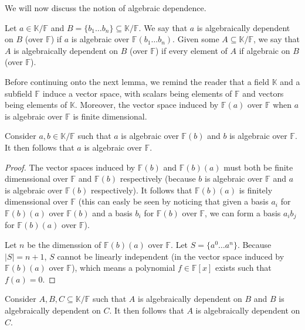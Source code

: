 We will now discuss the notion of algebraic dependence.

\begin{defn}
  Let $a \in \mathbb K / \mathbb F$ and $B = \{b _1 \ldots b _n \} \subseteq  \mathbb K / \mathbb F$. We say that $a$ is algebraically dependent on $B$ (over $ \mathbb{F} $) if $a$ is algebraic over $\mathbb F(b _1 \ldots b _n )$. Given some $A \subseteq  \mathbb K / \mathbb{F} $, we say that $A$ is algebraically dependent on $B$ (over $\mathbb{F} $) if every element of $A$ if algebraic on $B$ (over $\mathbb{F} $).
\end{defn}

Before continuing onto the next lemma, we remind the reader that a field $\mathbb K$ and a subfield $\mathbb{F}$ induce a vector space, with scalars being elements of $\mathbb{F} $ and vectors being elements of $\mathbb K$. Moreover, the vector space induced by $\mathbb{F} (a)$ over $\mathbb{F} $ when $a$ is algebraic over $\mathbb{F} $ is finite dimensional.

\begin{lemma}\label{lem:algebraic-transitivity}
  Consider $a, b \in \mathbb K / \mathbb{F} $ such that $a$ is algebraic over $\mathbb{F}(b) $ and $b$ is algebraic over $\mathbb{F}$. It then follows that $a$ is algebraic over $\mathbb{F}$.
\end{lemma}

\begin{proof}
  The vector spaces induced by $\mathbb{F} (b)$ and $\mathbb{F} (b)(a)$ must both be finite dimenssional over $\mathbb{F} $ and $\mathbb{F} (b)$ respectively (because $b$ is algebraic over $\mathbb{F} $ and $a$ is algebraic over $\mathbb{F} (b)$ respectively). It follows that $\mathbb{F} (b)(a)$ is finitely dimenssional over $\mathbb{F}$ (this can easly be seen by noticing that given a basis $a _i $ for $\mathbb{F} (b)(a)$ over $\mathbb{F} (b)$ and a basis $b _i $ for $\mathbb{F} (b)$ over $\mathbb{F} $, we can form a basis $a _i b _j $ for $\mathbb{F} (b)(a)$ over $\mathbb{F} $). 

  Let $n$ be the dimenssion of $\mathbb{F} (b)(a)$ over $\mathbb{F} $. Let $S = \{a ^0 \ldots a ^n \}$. Because $|S| = n + 1$, $S$ cannot be linearly independent (in the vector space induced by $\mathbb{F} (b)(a)$ over $\mathbb{F} $), which means a polynomial $f \in \mathbb{F} [x]$ exists such that $f(a) = 0$.
\end{proof}

\begin{lemma}\label{lem:algebraic-dependence-transitivity}
  Consider $A, B, C \subseteq \mathbb K / \mathbb{F} $ such that $A$ is algebraically dependent on $B$ and $B$ is algebraically dependent on $C$. It then follows that $A$ is algebraically dependent on $C$.
\end{lemma}

